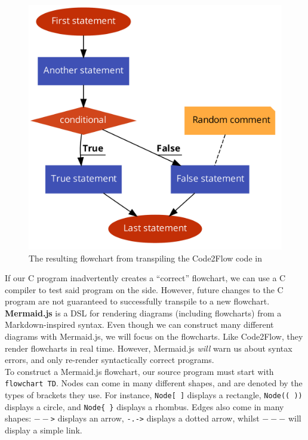 \begin{figure}[ht]
    \centering
    \includegraphics[scale=.28]{assets/chapter3/Code2FlowExample.pdf}
    \caption{The resulting flowchart from transpiling the Code2Flow code in }
    \label{A Code2Flow flowchart.}
\end{figure}

If our C program inadvertently creates a ``correct'' flowchart, we can use a C compiler to test said program on the side. However, future changes to the C program are not guaranteed to successfully transpile to a new flowchart. \\

\textbf{Mermaid.js} is a DSL for rendering diagrams (including flowcharts) from a Markdown-inspired syntax. Even though we can construct many different diagrams with Mermaid.js, we will focus on the flowcharts. Like Code2Flow, they render flowcharts in real time. However, Mermaid.js \textit{will} warn us about syntax errors, and only re-render syntactically correct programs. \\

To construct a Mermaid.js flowchart, our source program must start with \texttt{flowchart TD}. Nodes can come in many different shapes, and are denoted by the types of brackets they use. For instance, \texttt{Node[ ]} displays a rectangle, \texttt{Node(( ))} displays a circle, and \texttt{Node\{ \}} displays a rhombus. Edges also come in many shapes: \texttt{$--$>} displays an arrow, \texttt{-.->} displays a dotted arrow, whilst \texttt{$---$} will display a simple link. \\

